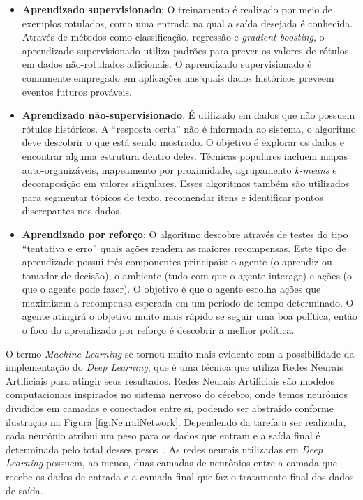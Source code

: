 \documentclass{article}
\begin{document}
\begin{itemize}
\item \textbf{Aprendizado supervisionado}: O treinamento é realizado por meio de exemplos rotulados, como uma entrada na qual a saída desejada é conhecida. Através de métodos como classificação, regressão e \textit{gradient boosting}, o aprendizado supervisionado utiliza padrões para prever os valores de rótulos em dados não-rotulados adicionais. O aprendizado supervisionado é comumente empregado em aplicações nas quais dados históricos preveem eventos futuros prováveis.
\item \textbf{Aprendizado não-supervisionado}: É utilizado em dados que não possuem rótulos históricos. A “resposta certa” não é informada ao sistema, o algoritmo deve descobrir o que está sendo mostrado. O objetivo é explorar os dados e encontrar alguma estrutura dentro deles. Técnicas populares incluem mapas auto-organizáveis, mapeamento por proximidade, agrupamento \textit{k-means} e decomposição em valores singulares. Esses algoritmos também são utilizados para segmentar tópicos de texto, recomendar itens e identificar pontos discrepantes nos dados.
\item \textbf{Aprendizado por reforço}: O algoritmo descobre através de testes do tipo “tentativa e erro” quais ações rendem as maiores recompensas. Este tipo de aprendizado possui três componentes principais: o agente (o aprendiz ou tomador de decisão), o ambiente (tudo com que o agente interage) e ações (o que o agente pode fazer). O objetivo é que o agente escolha ações que maximizem a recompensa esperada em um período de tempo determinado. O agente atingirá o objetivo muito mais rápido se seguir uma boa política, então o foco do aprendizado por reforço é descobrir a melhor política.
\end{itemize}

O termo \textit{Machine Learning} se tornou muito mais evidente com a possibilidade da implementação do \textit{Deep Learning}, que é uma técnica que utiliza Redes Neurais Artificiais para atingir seus resultados. Redes Neurais Artificiais são modelos computacionais inspirados no sistema nervoso do cérebro, onde temos neurônios divididos em camadas e conectados entre si, podendo ser abstraído conforme ilustração na Figura \ref{fig:NeuralNetwork}. Dependendo da tarefa a ser realizada, cada neurônio atribui um peso para os dados que entram e a saída final é determinada pelo total desses pesos~\citep{Copeland_2016}. As redes neurais utilizadas em \textit{Deep Learning} possuem, ao menos, duas camadas de neurônios entre a camada que recebe os dados de entrada e a camada final que faz o tratamento final dos dados de saída.
\end{document}
